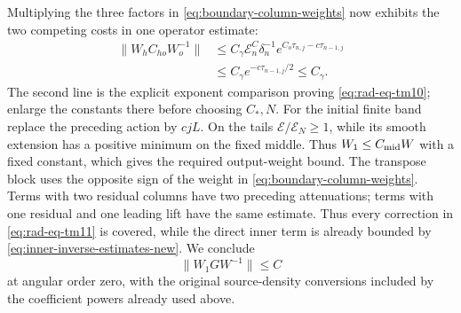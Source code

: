 Multiplying the three factors in \eqref{eq:boundary-column-weights}
now exhibits the two competing costs in one operator estimate:
\begin{equation}\label{eq:one-boundary-cross-block}
 \begin{aligned}
 \|W_hC_{ho}W_o^{-1}\|
 &\le C_\gamma\mathcal E_n^C\delta_n^{-1}
             e^{C_o\tau_{n,j}-c\tau_{n-1,j}}\\
 &\le C_\gamma e^{-c\tau_{n-1,j}/2}\le C_\gamma.
 \end{aligned}
\end{equation}
The second line is the explicit exponent comparison proving
\eqref{eq:rad-eq-tm10}; enlarge the constants there before choosing
$C_*,N$.  For the initial finite band replace the preceding action by
$cjL$.  On the tails $\mathcal E/\mathcal E_N\ge1$, while its smooth extension
has a positive minimum on the fixed middle.  Thus $W_1\le C_{\rm mid}W$
with a fixed constant, which gives the required output-weight bound.
The transpose block uses the opposite sign of the weight in
\eqref{eq:boundary-column-weights}.  Terms with two residual columns
have two preceding attenuations; terms with one residual and one leading
lift have the same estimate.  Thus every correction in
\eqref{eq:rad-eq-tm11} is covered, while the direct inner term is
already bounded by \eqref{eq:inner-inverse-estimates-new}.
We conclude
\begin{equation}\label{eq:global-reference-bound-new}
 \|W_1GW^{-1}\|\le C
\end{equation}
at angular order zero, with the original source-density conversions
included by the coefficient powers already used above.

